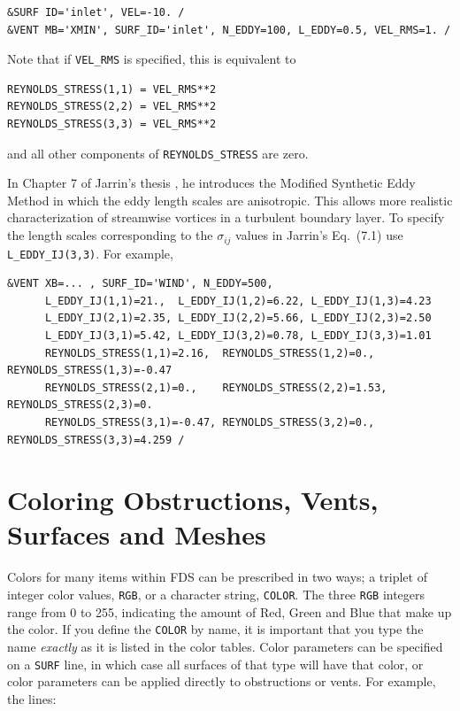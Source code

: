 \documentclass[11pt]{book}
\newcommand{\ct}{\tt\small}
\begin{document}
\footnotesize
\begin{verbatim}
&SURF ID='inlet', VEL=-10. /
&VENT MB='XMIN', SURF_ID='inlet', N_EDDY=100, L_EDDY=0.5, VEL_RMS=1. /
\end{verbatim} \normalsize

\noindent Note that if {\ct VEL\_RMS} is specified, this is equivalent to

\footnotesize
\begin{verbatim}
REYNOLDS_STRESS(1,1) = VEL_RMS**2
REYNOLDS_STRESS(2,2) = VEL_RMS**2
REYNOLDS_STRESS(3,3) = VEL_RMS**2
\end{verbatim} \normalsize

\noindent and all other components of {\ct REYNOLDS\_STRESS} are zero.

In Chapter 7 of Jarrin's thesis \cite{Jarrin:2008}, he introduces the Modified Synthetic Eddy Method in which the eddy length scales are anisotropic.
This allows more realistic characterization of streamwise vortices in a turbulent boundary layer.
To specify the length scales corresponding to the $\sigma_{ij}$ values in Jarrin's Eq.~(7.1) use {\ct L\_EDDY\_IJ(3,3)}.  For example,

\footnotesize
\begin{verbatim}
&VENT XB=... , SURF_ID='WIND', N_EDDY=500,
      L_EDDY_IJ(1,1)=21.,  L_EDDY_IJ(1,2)=6.22, L_EDDY_IJ(1,3)=4.23
      L_EDDY_IJ(2,1)=2.35, L_EDDY_IJ(2,2)=5.66, L_EDDY_IJ(2,3)=2.50
      L_EDDY_IJ(3,1)=5.42, L_EDDY_IJ(3,2)=0.78, L_EDDY_IJ(3,3)=1.01
      REYNOLDS_STRESS(1,1)=2.16,  REYNOLDS_STRESS(1,2)=0.,   REYNOLDS_STRESS(1,3)=-0.47
      REYNOLDS_STRESS(2,1)=0.,    REYNOLDS_STRESS(2,2)=1.53, REYNOLDS_STRESS(2,3)=0.
      REYNOLDS_STRESS(3,1)=-0.47, REYNOLDS_STRESS(3,2)=0.,   REYNOLDS_STRESS(3,3)=4.259 /
\end{verbatim} \normalsize

\clearpage

\section{Coloring Obstructions, Vents, Surfaces and Meshes}
\label{info:colors}

Colors for many items within FDS can be prescribed in two ways; a triplet of
integer color values, {\ct RGB}, or a character string, {\ct COLOR}. The three {\ct RGB} integers range from 0 to 255, indicating the amount of Red, Green and Blue
that make up the color. If you define the {\ct COLOR} by name, it is important that you type the name {\em exactly} as it is listed in the color tables. Color parameters can be specified on a {\ct SURF} line, in which case all surfaces of that type will have that color, or color parameters can be applied directly to obstructions or vents. For example, the lines:
\end{document}
